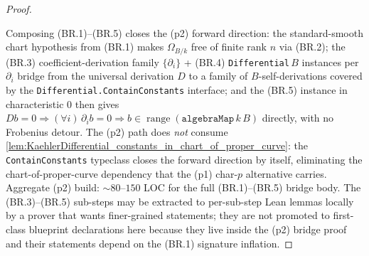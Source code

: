 \begin{proof}
\begin{itemize}
  \end{itemize}

  Composing (BR.1)--(BR.5) closes the (p2) forward direction: the standard-smooth chart hypothesis from (BR.1) makes \(\Omega_{B/k}\) free of finite rank \(n\) via (BR.2); the (BR.3) coefficient-derivation family \(\{\partial_i\}\) + (BR.4) \texttt{Differential}\,\(B\) instances per \(\partial_i\) bridge from the universal derivation \(D\) to a family of \(B\)-self-derivations covered by the \texttt{Differential.ContainConstants} interface; and the (BR.5) instance in characteristic \(0\) then gives \(D b = 0 \Rightarrow (\forall i)\,\partial_i b = 0 \Rightarrow b \in \operatorname{range}(\mathtt{algebraMap}\,k\,B)\) directly, with no Frobenius detour. The (p2) path does \emph{not} consume \cref{lem:KaehlerDifferential_constants_in_chart_of_proper_curve}: the \texttt{ContainConstants} typeclass closes the forward direction by itself, eliminating the chart-of-proper-curve dependency that the (p1) char-\(p\) alternative carries. Aggregate (p2) build: \(\sim 80\)--\(150\) LOC for the full (BR.1)--(BR.5) bridge body. The (BR.3)--(BR.5) sub-steps may be extracted to per-sub-step Lean lemmas locally by a prover that wants finer-grained statements; they are not promoted to first-class blueprint declarations here because they live inside the (p2) bridge proof and their statements depend on the (BR.1) signature inflation.


\end{proof}
